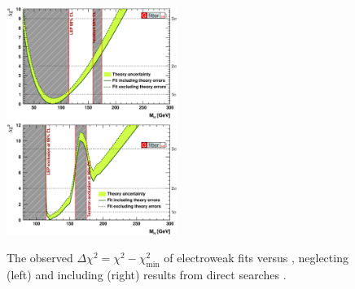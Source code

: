 \begin{figure}
	\includegraphics[width=0.495\textwidth]{tex/motivation/ewfit_nodirect}
	\hfill
	\includegraphics[width=0.495\textwidth]{tex/motivation/ewfit_withdirect}
	\caption{The observed $\Delta\chi^2 = \chi^2 - \chi^2_{\min}$ of electroweak fits 
	versus \mH, neglecting (left) and including (right) results from direct searches
	\cite{Gfitter:2008}.}
	\label{fig:ewfit}
\end{figure}

